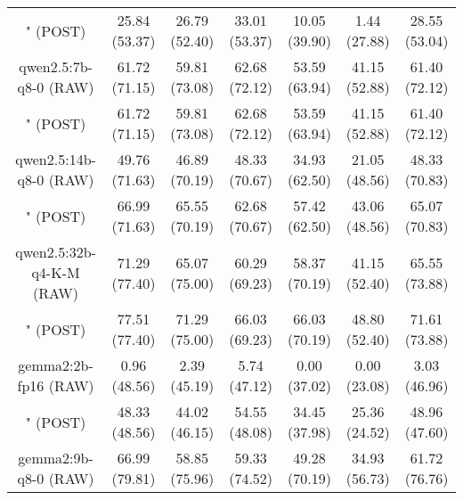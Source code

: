\begin{table}[]
{\begin{tabular}{ccccccc}
      \multicolumn{1}{c|}{" (POST)} & 25.84 (53.37) & 26.79 (52.40) & \multicolumn{1}{c|}{33.01 (53.37)} & 10.05 (39.90) & \multicolumn{1}{c|}{1.44 (27.88)} & 28.55 (53.04) \\
      \cline{1-7}

      \multicolumn{1}{c|}{qwen2.5:7b-q8-0 (RAW)} & 61.72 (71.15) & 59.81 (73.08) & \multicolumn{1}{c|}{62.68 (72.12)} & 53.59 (63.94) & \multicolumn{1}{c|}{41.15 (52.88)} & 61.40 (72.12) \\

      \multicolumn{1}{c|}{" (POST)} & 61.72 (71.15) & 59.81 (73.08) & \multicolumn{1}{c|}{62.68 (72.12)} & 53.59 (63.94) & \multicolumn{1}{c|}{41.15 (52.88)} & 61.40 (72.12) \\
      \cline{1-7}

      \multicolumn{1}{c|}{qwen2.5:14b-q8-0 (RAW)} & 49.76 (71.63) & 46.89 (70.19) & \multicolumn{1}{c|}{48.33 (70.67)} & 34.93 (62.50) & \multicolumn{1}{c|}{21.05 (48.56)} & 48.33 (70.83) \\

      \multicolumn{1}{c|}{" (POST)} & 66.99 (71.63) & 65.55 (70.19) & \multicolumn{1}{c|}{62.68 (70.67)} & 57.42 (62.50) & \multicolumn{1}{c|}{43.06 (48.56)} & 65.07 (70.83) \\
      \cline{1-7}

      \multicolumn{1}{c|}{qwen2.5:32b-q4-K-M (RAW)} & 71.29 (77.40) & 65.07 (75.00) & \multicolumn{1}{c|}{60.29 (69.23)} & 58.37 (70.19) & \multicolumn{1}{c|}{41.15 (52.40)} & 65.55 (73.88) \\

      \multicolumn{1}{c|}{" (POST)} & 77.51 (77.40) & 71.29 (75.00) & \multicolumn{1}{c|}{66.03 (69.23)} & 66.03 (70.19) & \multicolumn{1}{c|}{48.80 (52.40)} & 71.61 (73.88) \\
      \cline{1-7}

      \multicolumn{1}{c|}{gemma2:2b-fp16 (RAW)} & 0.96 (48.56) & 2.39 (45.19) & \multicolumn{1}{c|}{5.74 (47.12)} & 0.00 (37.02) & \multicolumn{1}{c|}{0.00 (23.08)} & 3.03 (46.96) \\

      \multicolumn{1}{c|}{" (POST)} & 48.33 (48.56) & 44.02 (46.15) & \multicolumn{1}{c|}{54.55 (48.08)} & 34.45 (37.98) & \multicolumn{1}{c|}{25.36 (24.52)} & 48.96 (47.60) \\
      \cline{1-7}

      \multicolumn{1}{c|}{gemma2:9b-q8-0 (RAW)} & 66.99 (79.81) & 58.85 (75.96) & \multicolumn{1}{c|}{59.33 (74.52)} & 49.28 (70.19) & \multicolumn{1}{c|}{34.93 (56.73)} & 61.72 (76.76) \\


\end{tabular}}
\end{table}
